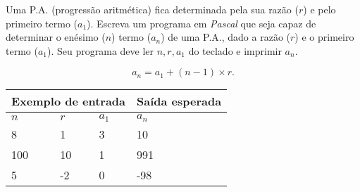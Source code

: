 \item Uma P.A. (progressão aritmética) fica determinada pela sua razão ($r$) 
e pelo primeiro termo ($a_1$). Escreva um programa em \emph{Pascal} que seja 
capaz de determinar o enésimo ($n$) termo ($a_n$) de uma P.A., dado a razão 
($r$) e o primeiro termo ($a_1$). Seu programa deve ler $n, r, a_1$ do teclado
e imprimir $a_n$.

\[
a_n = a_1 + (n-1)\times r.
\]

\begin{center}
\begin{tabular}{|l|l|l|l|} \hline
\multicolumn{3}{|c|}{Exemplo de entrada} & Saída esperada \\ \hline
$n$ & $r$ & $a_1$   & $a_n$               \\ \hline
8 & 1 & 3       & 10                \\ \hline
100 & 10 & 1    & 991                \\ \hline
5 & -2 & 0      & -98                \\ \hline
\end{tabular}
\end{center}